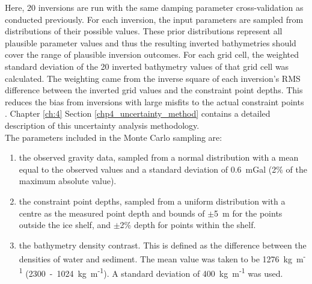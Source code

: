 Here, 20 inversions are run with the same damping parameter cross-validation as conducted previously. For each inversion, the input parameters are sampled from distributions of their possible values. These prior distributions represent all plausible parameter values and thus the resulting inverted bathymetries should cover the range of plausible inversion outcomes. For each grid cell, the weighted standard deviation of the 20 inverted bathymetry values of that grid cell was calculated. The weighting came from the inverse square of each inversion's RMS difference between the inverted grid values and the constraint point depths. This reduces the bias from inversions with large misfits to the actual constraint points \citep{schnaidtbootstrap2015}. Chapter \ref{ch:4} Section \ref{chp4_uncertainty_method} contains a detailed description of this uncertainty analysis methodology. \\



The parameters included in the Monte Carlo sampling are:
\begin{enumerate}
    \item the observed gravity data, sampled from a normal distribution with a mean equal to the observed values and a standard deviation of 0.6~mGal (2\% of the maximum absolute value).
    \item the constraint point depths, sampled from a uniform distribution with a centre as the measured point depth and bounds of $\pm$5~m for the points outside the ice shelf, and $\pm$2\% depth for points within the shelf.
    \item the bathymetry density contrast. This is defined as the difference between the densities of water and sediment. The mean value was taken to be 1276~kg~m\textsuperscript{-1} (2300~-~1024~kg~m\textsuperscript{-1}). A standard deviation of 400~kg~m\textsuperscript{-1} was used.
\end{enumerate} 

